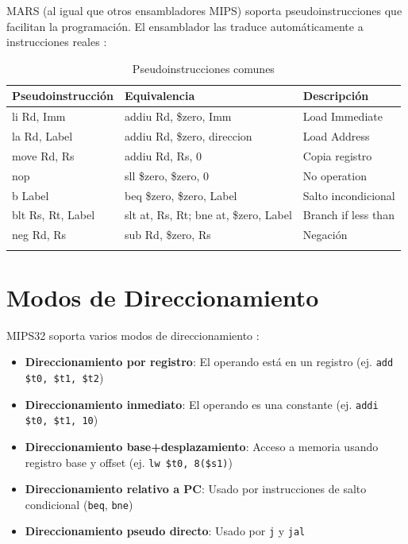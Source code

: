 \documentclass[12pt]{article}
\begin{document}
MARS (al igual que otros ensambladores MIPS) soporta pseudoinstrucciones que facilitan la programación. El ensamblador las traduce automáticamente a instrucciones reales \cite{mipsguide}:

\begin{longtable}{|l|l|l|}
    \hline
    \textbf{Pseudoinstrucción} & \textbf{Equivalencia} & \textbf{Descripción} \\
    \hline
    li Rd, Imm & addiu Rd, \$zero, Imm & Load Immediate \\
    \hline
    la Rd, Label & addiu Rd, \$zero, direccion & Load Address \\
    \hline
    move Rd, Rs & addiu Rd, Rs, 0 & Copia registro \\
    \hline
    nop & sll \$zero, \$zero, 0 & No operation \\
    \hline
    b Label & beq \$zero, \$zero, Label & Salto incondicional \\
    \hline
    blt Rs, Rt, Label & slt at, Rs, Rt; bne at, \$zero, Label & Branch if less than \\
    \hline
    neg Rd, Rs & sub Rd, \$zero, Rs & Negación \\
    \hline
    \caption{Pseudoinstrucciones comunes}
\end{longtable}

\section{Modos de Direccionamiento}

MIPS32 soporta varios modos de direccionamiento \cite{mipsguide}:

\begin{itemize}
    \item \textbf{Direccionamiento por registro}: El operando está en un registro (ej. \texttt{add \$t0, \$t1, \$t2})
    \item \textbf{Direccionamiento inmediato}: El operando es una constante (ej. \texttt{addi \$t0, \$t1, 10})
    \item \textbf{Direccionamiento base+desplazamiento}: Acceso a memoria usando registro base y offset (ej. \texttt{lw \$t0, 8(\$s1)})
    \item \textbf{Direccionamiento relativo a PC}: Usado por instrucciones de salto condicional (\texttt{beq}, \texttt{bne})
    \item \textbf{Direccionamiento pseudo directo}: Usado por \texttt{j} y \texttt{jal}
\end{itemize}
\end{document}
